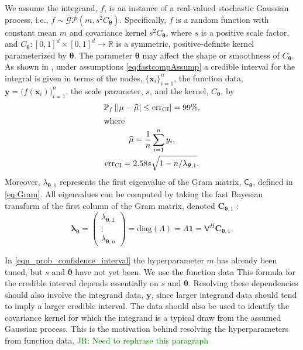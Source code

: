 \documentclass[graybox,footinfo]{svmult}
\newcommand{\bm}[1]{\boldsymbol{#1}}
\newcommand{\vlambda}{{\bm{\lambda}}}
\newcommand{\vtheta}{{\bm{\theta}}}
\newcommand{\vC}{\bm{C}}
\newcommand{\vx}{\bm{x}}
\newcommand{\vy}{\bm{y}}
\newcommand{\vone}{\bm{1}}
\newcommand{\mC}{\mathsf{C}}
\newcommand{\mLambda}{\mathsf{\Lambda}}
\newcommand{\mV}{\mathsf{V}}
\newcommand{\hmu}{\widehat{\mu}}
\newcommand{\CI}{\textup{CI}}
\newcommand{\diag}{\text{diag}}
\newcommand{\err}{\textup{err}}
\newcommand{\JRNote}[1]{{\textcolor{green}{JR: #1}}}
\begin{document}
We assume the integrand, $f$, is an instance of a real-valued stochastic Gaussian process, i.e., $f \sim \mathcal{GP}(m,s^2 C_\vtheta)$.  Specifically, $f$ is a random function with constant mean $m$ and covariance kernel $s^2C_\vtheta$, where $s$ is a positive scale factor, and $C_\vtheta: [0,1]^d \times [0,1]^d \to \mathbb{R} $ is a symmetric, positive-definite kernel parameterized by $\vtheta$.  The parameter $\vtheta$ may affect the shape or smoothness of $C_\vtheta$. As shown in \cite[Give eq numbers]{RatHic19a}, under assumptions \eqref{eq:fastcompAssump} a credible interval for the integral is given in terms of the nodes, $\{\vx_i\}_{i=1}^n$, the function data, $\vy = \bigl (f (\vx_i) \bigr)_{i=1}^n$, the scale parameter, $s$, and the kernel, $C_\vtheta$,  by 
\begin{subequations} \label{eqn_prob_confidence_interval}
	\begin{gather}
	\mathbb{P}_f \left[
	|\mu-\hmu| \leq \err_{\CI}
	\right] = 99\%, \\
	\intertext{where}
	\label{muhatGCV-FB-MLE-Simple}
	\hmu = \frac 1n \sum_{i=1}^n y_i, \\
	\label{eqn:errcifast}
	\err_{\CI} = 2.58 s \sqrt{1 - n/\lambda_{\vtheta,1} }.
	\end{gather}
\end{subequations}
Moreover, $\lambda_{\vtheta,1}$ represents the first eigenvalue of the Gram matrix, $\mC_\vtheta$, defined in \eqref{eq:Gram}.  All eigenvalues can be computed %
by taking the fast Bayesian transform of the first column of the Gram matrix, denoted $\vC_{\vtheta,1}$ \cite[Equation number]{RatHic19a}:
\begin{equation} 
	\vlambda_\vtheta
	= \begin{pmatrix}
		\lambda_{\vtheta,1} \\ \vdots \\ \lambda _{\vtheta,n}
	\end{pmatrix} = \diag(\mLambda) = \mLambda \vone 
	= \mV^H \vC_{\vtheta,1}.
	\label{eqn:fast_transform_to_eigvalues}
\end{equation}

In \eqref{eqn_prob_confidence_interval} the hyperparameter $m$ has already been tuned, but $s$ and $\vtheta$ have not yet been.  We use the function data 
This formula for the credible interval depends essentially on $s$ and $\vtheta$.  Resolving these dependencies should also involve the integrand data,  $\vy$, since larger integrand data should tend to imply a larger credible interval. The data should also be used to identify the covariance kernel for which the integrand is a typical draw from the assumed Gaussian process. This is the motivation behind resolving the hyperparameters from function data. 
\JRNote{Need to rephrase this paragraph}
\end{document}
